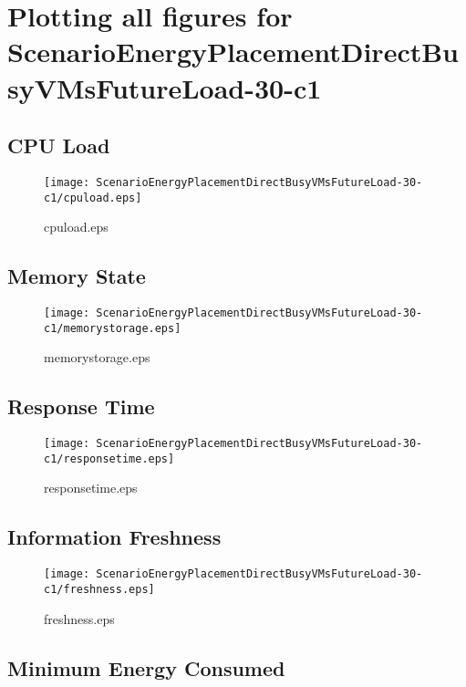 \documentclass{elsart}
\begin{document}
\section{Plotting all figures for ScenarioEnergyPlacementDirectBusyVMsFutureLoad-30-c1}
\subsection{CPU Load}

\begin{figure}[ht]
\centering
\texttt{[image: ScenarioEnergyPlacementDirectBusyVMsFutureLoad-30-c1/cpuload.eps]}
\caption{cpuload.eps}\label{fig:cpuload}
\end{figure}

\clearpage
\subsection{Memory State}

\begin{figure}[ht]
\centering
\texttt{[image: ScenarioEnergyPlacementDirectBusyVMsFutureLoad-30-c1/memorystorage.eps]}
\caption{memorystorage.eps}\label{fig:memorystorage}
\end{figure}

\clearpage
\subsection{Response Time}

\begin{figure}[ht]
\centering
\texttt{[image: ScenarioEnergyPlacementDirectBusyVMsFutureLoad-30-c1/responsetime.eps]}
\caption{responsetime.eps}\label{fig:responsetime}
\end{figure}

\clearpage
\subsection{Information Freshness}

\begin{figure}[ht]
\centering
\texttt{[image: ScenarioEnergyPlacementDirectBusyVMsFutureLoad-30-c1/freshness.eps]}
\caption{freshness.eps}\label{fig:freshness}
\end{figure}

\clearpage
\subsection{Minimum Energy Consumed}
\end{document}

